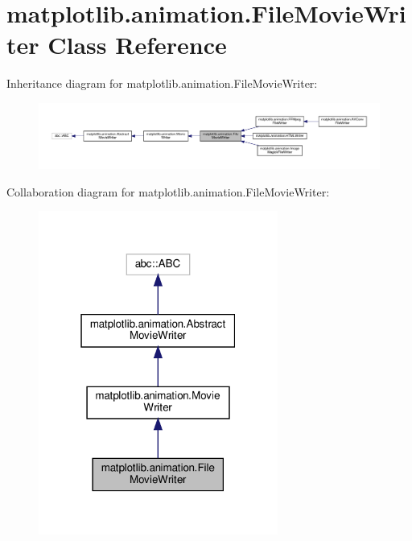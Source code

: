 \hypertarget{classmatplotlib_1_1animation_1_1FileMovieWriter}{}\section{matplotlib.\+animation.\+File\+Movie\+Writer Class Reference}
\label{classmatplotlib_1_1animation_1_1FileMovieWriter}


Inheritance diagram for matplotlib.\+animation.\+File\+Movie\+Writer\+:
\nopagebreak
\begin{figure}[H]
\begin{center}
\leavevmode
\includegraphics[width=350pt]{classmatplotlib_1_1animation_1_1FileMovieWriter__inherit__graph}
\end{center}
\end{figure}


Collaboration diagram for matplotlib.\+animation.\+File\+Movie\+Writer\+:
\nopagebreak
\begin{figure}[H]
\begin{center}
\leavevmode
\includegraphics[width=223pt]{classmatplotlib_1_1animation_1_1FileMovieWriter__coll__graph}
\end{center}
\end{figure}
